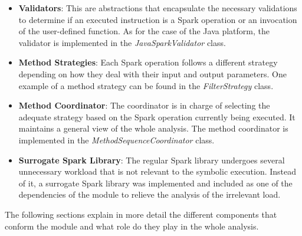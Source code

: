 \begin{itemize}
	\item \textbf{Validators}: This are abstractions that encapsulate the necessary validations to determine if an executed instruction is a Spark operation or an invocation of the user-defined function. As for the case of the Java platform, the validator is implemented in the \textit{JavaSparkValidator} class.
	\item \textbf{Method Strategies}: Each Spark operation follows a different strategy depending on how they deal with their input and output parameters. One example of a method strategy can be found in the \textit{FilterStrategy} class.
	\item \textbf{Method Coordinator}: The coordinator is in charge of selecting the adequate strategy based on the Spark operation currently being executed. It maintains a general view of the whole analysis. The method coordinator is implemented in the \textit{MethodSequenceCoordinator} class.
	\item \textbf{Surrogate Spark Library}: The regular Spark library undergoes several unnecessary workload that is not relevant to the symbolic execution. Instead of it, a surrogate Spark library was implemented and included as one of the dependencies of the module to relieve the analysis of the irrelevant load.
\end{itemize}

The following sections explain in more detail the different components that conform the module and what role do they play in the whole analysis.






